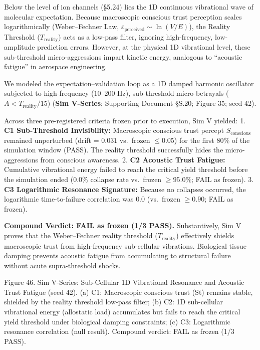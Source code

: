 \documentclass[
]{article}
\begin{document}
Below the level of ion channels (§5.24) lies the 1D continuous
vibrational wave of molecular expectation. Because macroscopic conscious
trust perception scales logarithmically (Weber--Fechner Law,
\(\varepsilon_{\text{perceived}} \sim \ln(V/E)\)), the Reality Threshold
(\(T_{\text{reality}}\)) acts as a low-pass filter, ignoring
high-frequency, low-amplitude prediction errors. However, at the
physical 1D vibrational level, these sub-threshold micro-aggressions
impart kinetic energy, analogous to ``acoustic fatigue'' in aerospace
engineering.

We modeled the expectation--validation loop as a 1D damped harmonic
oscillator subjected to high-frequency (\(10\text{--}200\text{ Hz}\)),
sub-threshold micro-betrayals (\(A < T_{\text{reality}}/15\))
(\textbf{Sim V-Series}; Supporting Document §S.20; Figure 35; seed 42).

Across three pre-registered criteria frozen prior to execution, Sim V
yielded: 1. \textbf{C1 Sub-Threshold Invisibility:} Macroscopic
conscious trust percept \(S_{\text{conscious}}\) remained unperturbed
(drift = \(0.031\) vs.~frozen \(\le 0.05\)) for the first 80\% of the
simulation window (PASS). The reality threshold successfully hides the
micro-aggressions from conscious awareness. 2. \textbf{C2 Acoustic Trust
Fatigue:} Cumulative vibrational energy failed to reach the critical
yield threshold before the simulation ended (\(0.0\%\) collapse rate
vs.~frozen \(\ge 95.0\%\); FAIL as frozen). 3. \textbf{C3 Logarithmic
Resonance Signature:} Because no collapses occurred, the logarithmic
time-to-failure correlation was \(0.0\) (vs.~frozen \(\ge 0.90\); FAIL
as frozen).

\textbf{Compound Verdict: FAIL as frozen (1/3 PASS).} Substantively, Sim
V proves that the Weber--Fechner reality threshold
(\(T_{\text{reality}}\)) effectively shields macroscopic trust from
high-frequency sub-cellular vibrations. Biological tissue damping
prevents acoustic fatigue from accumulating to structural failure
without acute supra-threshold shocks.

Figure 46. Sim V-Series: Sub-Cellular 1D Vibrational Resonance and
Acoustic Trust Fatigue (seed 42). (a) C1: Macroscopic conscious trust
({St}) remains stable, shielded by the reality threshold low-pass
filter; (b) C2: 1D sub-cellular vibrational energy (allostatic load)
accumulates but fails to reach the critical yield threshold under
biological damping constraints; (c) C3: Logarithmic resonance
correlation (null result). Compound verdict: FAIL as frozen (1/3 PASS).
\end{document}
